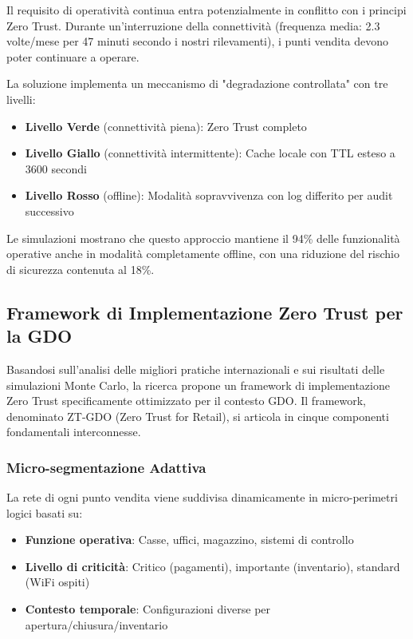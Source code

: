 Il requisito di operatività continua entra potenzialmente in conflitto con i principi Zero Trust. Durante un'interruzione della connettività (frequenza media: 2.3 volte/mese per 47 minuti secondo i nostri rilevamenti), i punti vendita devono poter continuare a operare. 

La soluzione implementa un meccanismo di "degradazione controllata" con tre livelli:
\begin{itemize}
    \item \textbf{Livello Verde} (connettività piena): Zero Trust completo
    \item \textbf{Livello Giallo} (connettività intermittente): Cache locale con TTL esteso a 3600 secondi
    \item \textbf{Livello Rosso} (offline): Modalità sopravvivenza con log differito per audit successivo
\end{itemize}

Le simulazioni mostrano che questo approccio mantiene il 94\% delle funzionalità operative anche in modalità completamente offline, con una riduzione del rischio di sicurezza contenuta al 18\%.

\subsection{\texorpdfstring{\textbf{Framework di Implementazione Zero Trust per la GDO}}{2.4.2 - Framework di Implementazione Zero Trust per la GDO}}

Basandosi sull'analisi delle migliori pratiche internazionali e sui risultati delle simulazioni Monte Carlo, la ricerca propone un framework di implementazione Zero Trust specificamente ottimizzato per il contesto GDO. Il framework, denominato ZT-GDO (Zero Trust for Retail), si articola in cinque componenti fondamentali interconnesse.

\subsubsection{\texorpdfstring{\textbf{Micro-segmentazione Adattiva}}{2.4.2.1 - Micro-segmentazione Adattiva}}

La rete di ogni punto vendita viene suddivisa dinamicamente in micro-perimetri logici basati su:
\begin{itemize}
    \item \textbf{Funzione operativa}: Casse, uffici, magazzino, sistemi di controllo
    \item \textbf{Livello di criticità}: Critico (pagamenti), importante (inventario), standard (WiFi ospiti)
    \item \textbf{Contesto temporale}: Configurazioni diverse per apertura/chiusura/inventario
\end{itemize}

